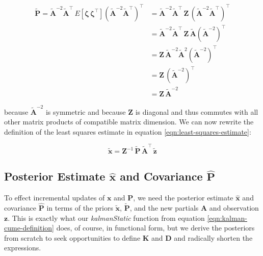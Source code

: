 \documentclass[10pt,oneside,x11names]{article}
\begin{document}
\begin{align*} 
\tilde{\mathbold{P}} =
{\tilde{\mathbold{A}}}^{-2}
{\tilde{\mathbold{A}}}^\intercal\,
E\left[
\mathbold{\zeta}\,\mathbold{\zeta}^\intercal
\right]
({\tilde{\mathbold{A}}}^{-2}
{\tilde{\mathbold{A}}}^\intercal)^\intercal 
&= 
{\tilde{\mathbold{A}}}^{-2}
{\tilde{\mathbold{A}}}^\intercal\,
\mathbold{Z}\,
({\tilde{\mathbold{A}}}^{-2}
{\tilde{\mathbold{A}}}^\intercal)^\intercal \\
&= 
{\tilde{\mathbold{A}}}^{-2}
{\tilde{\mathbold{A}}}^\intercal\,
\mathbold{Z}\,
{\tilde{\mathbold{A}}}
({\tilde{\mathbold{A}}}^{-2})^\intercal \\
&= 
\mathbold{Z}\,
{\tilde{\mathbold{A}}}^{-2}
{\tilde{\mathbold{A}}}^2
({\tilde{\mathbold{A}}}^{-2})^\intercal \\
&=
\mathbold{Z}\,
({\tilde{\mathbold{A}}}^{-2})^\intercal \\
&=
\mathbold{Z}\,
{\tilde{\mathbold{A}}}^{-2} 
\end{align*}

\noindent because \({\tilde{\mathbold{A}}}^{-2}\) is symmetric and
because \(\mathbold{Z}\)
is diagonal and thus commutes with all other matrix products
of compatible matrix dimension. We can now rewrite
the definition of the least squares estimate in equation \ref{eqn:least-squares-estimate}:

\begin{equation}
\label{eqn:estimate-of-the-priors}
{\tilde{\mathbold{x}}}=
\mathbold{Z}^{-1}\,
{\tilde{\mathbold{P}}}\,
{\tilde{\mathbold{A}}}^\intercal\,
{\tilde{\mathbold{z}}}
\end{equation}

\subsection{Posterior Estimate \(\hat{\mathbold{x}}\) and Covariance \(\hat{\mathbold{P}}\)}
\label{sec:orgheadline13}

To effect incremental updates of \(\mathbold{x}\) and \(\mathbold{P}\), we need the
posterior estimate \(\hat{\mathbold{x}}\) and covariance \(\hat{\mathbold{P}}\) in
terms of the priors \(\tilde{\mathbold{x}}\), \(\tilde{\mathbold{P}}\), and the new
partials \(\mathbold{A}\) and observation \(\mathbold{z}\). This is exactly what our
\emph{kalmanStatic} function from equation \ref{eqn:kalman-cume-definition} does, of course,
in functional form, but we derive the posteriors from scratch to seek
opportunities to define \(\mathbold{K}\) and \(\mathbold{D}\) and radically shorten
the expressions. 
\end{document}
